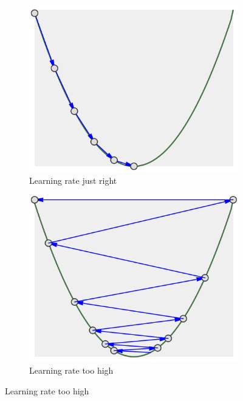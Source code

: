 \begin{figure} \label{fig:learning_rate}
    \centering
    \begin{subfigure}[b]{0.3\textwidth}
        \includegraphics[width=\textwidth]{images/lr_ok.png}
        \caption{Learning rate just right}
        \label{fig:lr_ok}
    \end{subfigure}
    \begin{subfigure}[b]{0.3\textwidth}
        \includegraphics[width=\textwidth]{images/lr_too_high.png}
        \caption{Learning rate too high}
        \label{fig:lr_too_high}
    \end{subfigure}

\end{figure}

